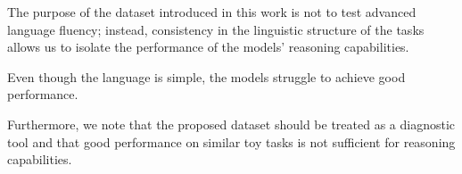The purpose of the dataset introduced in this work is not to test advanced language fluency; instead, consistency in the linguistic structure of the tasks allows us to isolate the performance of the models' reasoning capabilities.

Even though the language is simple, the models struggle to achieve good performance.

Furthermore, we note that the proposed dataset should be treated as a diagnostic tool and that good performance on similar toy tasks is not sufficient for reasoning capabilities.


